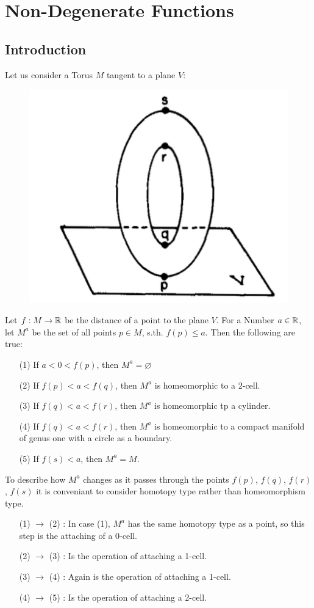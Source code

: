 \documentclass[a4paper,11pt]{article}
\begin{document}
\section{Non-Degenerate Functions}

\subsection{Introduction}

Let us consider a Torus $M$ tangent to a plane $V$:
\begin{figure}[H]
    \centering
    \includegraphics[width=0.4\linewidth]{resources/Diagram1.png}
    \label{fig:diagram1}
\end{figure}
Let $f: M \rightarrow {\mathbb R}$ be the distance of a point to the plane $V$. 
For a Number $a \in {\mathbb R} $, let $M^a$ be the set of all points $p \in M$, s.th. $f(p) \leq a$.
Then the following are true:
\begin{enumerate}
   \item[(1)] If $a < 0 < f(p)$, then $M^a = \varnothing$
   \item[(2)] If $f(p) < a < f(q)$, then $M^a$ is homeomorphic to a 2-cell.
   \item[(3)] If $f(q) < a < f(r)$, then $M^a$ is homeomorphic tp a cylinder.
   \item[(4)] If $f(q) < a < f(r)$, then $M^a$ is homeomorphic to a compact manifold of genus one with a circle as a boundary.
   \item[(5)] If $f(s) < a$, then $M^a = M$.
\end{enumerate}

To describe how $M^a$ changes as it passes through the points $f(p)$, $f(q)$, $f(r)$, $f(s)$ it is conveniant to consider
homotopy type rather than homeomorphism type. 
\begin{enumerate}[leftmargin=2cm]
   \item[(1) $\rightarrow$ (2)]: In case (1), $M^a$ has the same homotopy type as a point, so this step is the attaching of a 0-cell. 
   \item[(2) $\rightarrow$ (3)]: Is the operation of attaching a 1-cell. 
   \item[(3) $\rightarrow$ (4)]: Again is the operation of attaching a 1-cell. 
   \item[(4) $\rightarrow$ (5)]: Is the operation of attaching a 2-cell. 
\end{enumerate}
\end{document}
